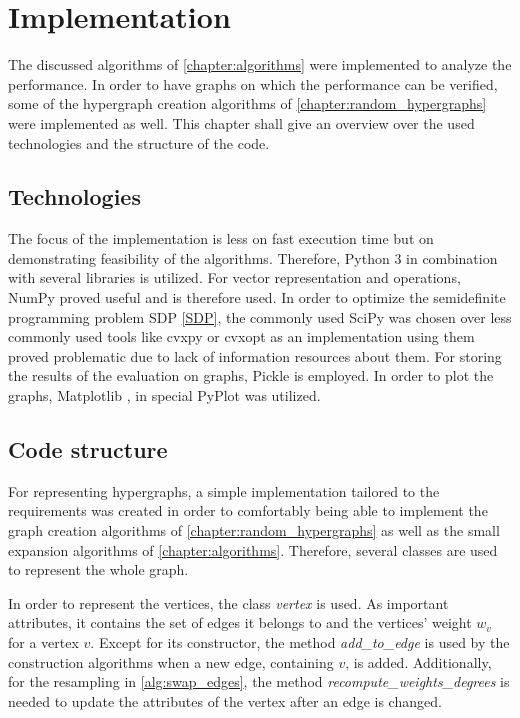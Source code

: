 \chapter{Implementation}\label{chapter:implementation}

The discussed algorithms of \cref{chapter:algorithms} were implemented to analyze the performance. In order to have graphs on which the performance can be verified, some of the hypergraph creation algorithms of \cref{chapter:random_hypergraphs} were implemented as well. This chapter shall give an overview over the used technologies and the structure of the code.

\section{Technologies}
The focus of the implementation is less on fast execution time but on demonstrating feasibility of the algorithms. Therefore, Python 3 in combination with several libraries is utilized.
For vector representation and operations, NumPy \cite{numpy} proved useful and is therefore used. In order to optimize the semidefinite programming problem SDP \ref{SDP}, the commonly used SciPy \cite{scipy} was chosen over less commonly used tools like cvxpy or cvxopt as an implementation using them proved problematic due to lack of information resources about them.
For storing the results of the evaluation on graphs, Pickle is employed. In order to plot the graphs, Matplotlib \cite{matplotlib}, in special PyPlot was utilized.



\section{Code structure}
For representing hypergraphs, a simple implementation tailored to the requirements was created in order to comfortably being able to implement the graph creation algorithms of \cref{chapter:random_hypergraphs} as well as the small expansion algorithms of \cref{chapter:algorithms}.
Therefore, several classes are used to represent the whole graph.

In order to represent the vertices, the class \textit{vertex} is used. As important attributes, it contains the set of edges it belongs to and the vertices' weight $w_v$ for a vertex $v$. Except for its constructor, the method \textit{add\_to\_edge} is used by the construction algorithms when a new edge, containing $v$, is added. Additionally, for the resampling in \cref{alg:swap_edges}, the method \textit{recompute\_weights\_degrees} is needed to update the attributes of the vertex after an edge is changed.

